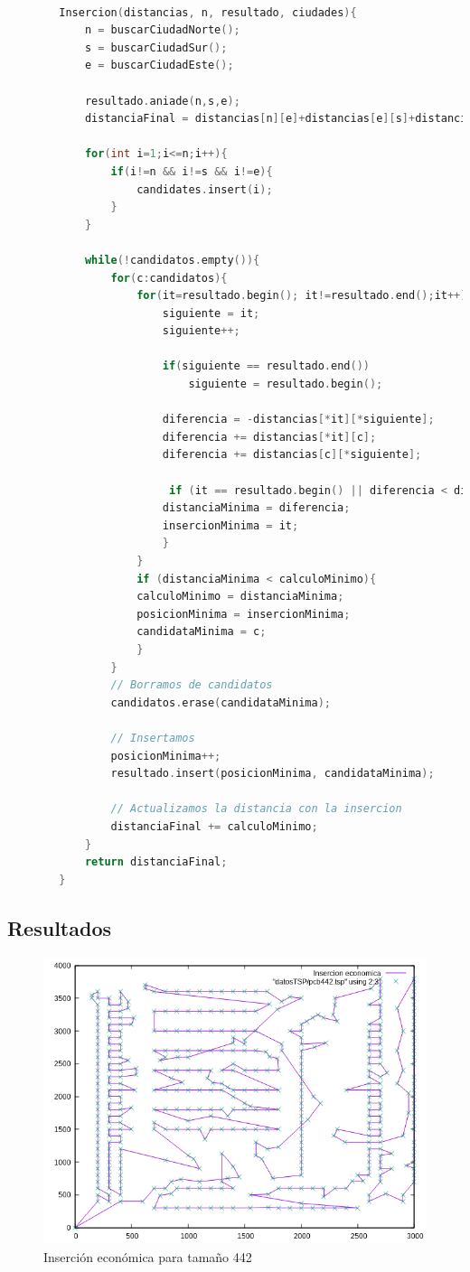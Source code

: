 \documentclass{article}
\begin{document}
	\begin{lstlisting}[caption=Pseudocódigo de la segunda heurística, language=c]
		
		Insercion(distancias, n, resultado, ciudades){
			n = buscarCiudadNorte();
			s = buscarCiudadSur();
			e = buscarCiudadEste();
			
			resultado.aniade(n,s,e);
			distanciaFinal = distancias[n][e]+distancias[e][s]+distancias[s][n];
			
			for(int i=1;i<=n;i++){
				if(i!=n && i!=s && i!=e){
					candidates.insert(i);
				}
			}
			
			while(!candidatos.empty()){
				for(c:candidatos){
					for(it=resultado.begin(); it!=resultado.end();it++){
						siguiente = it;
						siguiente++;
						
						if(siguiente == resultado.end())
							siguiente = resultado.begin();
							
						diferencia = -distancias[*it][*siguiente];
						diferencia += distancias[*it][c];
						diferencia += distancias[c][*siguiente];
						
						 if (it == resultado.begin() || diferencia < distanciaMinima){
						distanciaMinima = diferencia;
						insercionMinima = it;
						}
					}
					if (distanciaMinima < calculoMinimo){
					calculoMinimo = distanciaMinima;
					posicionMinima = insercionMinima;
					candidataMinima = c;
					}
				}
				// Borramos de candidatos
				candidatos.erase(candidataMinima);
				
				// Insertamos 
				posicionMinima++;
				resultado.insert(posicionMinima, candidataMinima);
				
				// Actualizamos la distancia con la insercion
				distanciaFinal += calculoMinimo;
			}
			return distanciaFinal;
		}
	\end{lstlisting}
	\subsection{Resultados}
	\begin{figure}[H]
		\centering
		\includegraphics[totalheight=8cm]{img/insercion_economica}
		\caption{Inserción económica para tamaño 442}
		\label{fig:insercion_economica}
	\end{figure}
\end{document}
